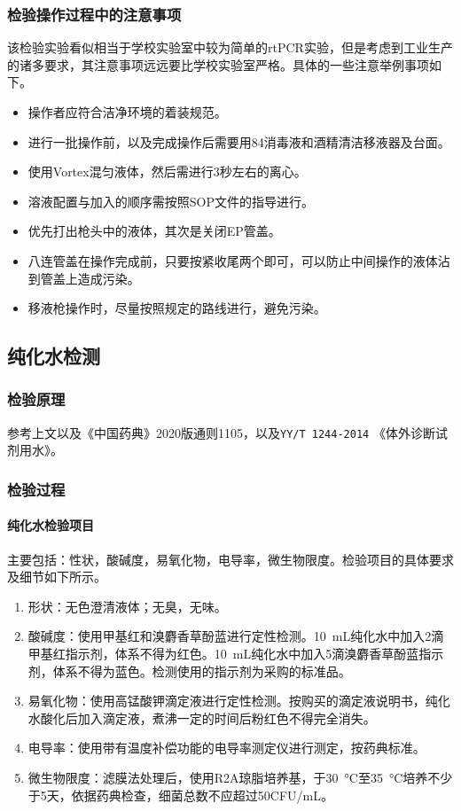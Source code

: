 \documentclass[cn,black,12pt,normal]{elegantnote}
\begin{document}
\subsubsection{检验操作过程中的注意事项}

该检验实验看似相当于学校实验室中较为简单的rtPCR实验，但是考虑到工业生产的诸多要求，其注意事项远远要比学校实验室严格。具体的一些注意举例事项如下。
\begin{itemize}
    \item 操作者应符合洁净环境的着装规范。
    \item 进行一批操作前，以及完成操作后需要用84消毒液和酒精清洁移液器及台面。
    \item 使用Vortex混匀液体，然后需进行3秒左右的离心。
    \item 溶液配置与加入的顺序需按照SOP文件的指导进行。
    \item 优先打出枪头中的液体，其次是关闭EP管盖。
    \item 八连管盖在操作完成前，只要按紧收尾两个即可，可以防止中间操作的液体沾到管盖上造成污染。
    \item 移液枪操作时，尽量按照规定的路线进行，避免污染。
\end{itemize}

\subsection{纯化水检测}

\subsubsection{检验原理}
参考上文以及《中国药典》2020版通则1105，以及\texttt{YY/T 1244-2014} 《体外诊断试剂用水》。

\subsubsection{检验过程}
\paragraph{纯化水检验项目} 主要包括：性状，酸碱度，易氧化物，电导率，微生物限度。检验项目的具体要求及细节如下所示。
\begin{enumerate}
    \item 形状：无色澄清液体；无臭，无味。
    \item 酸碱度：使用甲基红和溴麝香草酚蓝进行定性检测。\SI{10}{\milli\liter}纯化水中加入2滴甲基红指示剂，体系不得为红色。\SI{10}{\milli\liter}纯化水中加入5滴溴麝香草酚蓝指示剂，体系不得为蓝色。检测使用的指示剂为采购的标准品。
    \item 易氧化物：使用高锰酸钾滴定液进行定性检测。按购买的滴定液说明书，纯化水酸化后加入滴定液，煮沸一定的时间后粉红色不得完全消失。
    \item 电导率：使用带有温度补偿功能的电导率测定仪进行测定，按药典标准。
    \item 微生物限度：滤膜法处理后，使用R2A琼脂培养基，于\SI{30}{\celsius}至\SI{35}{\celsius}培养不少于5天，依据药典检查，细菌总数不应超过50CFU/mL。
\end{enumerate}
\end{document}
